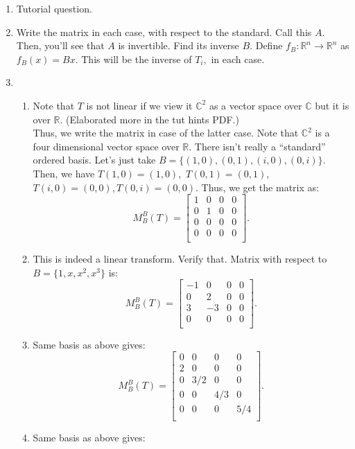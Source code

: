 \documentclass{article}
\begin{document}
\begin{enumerate}
	\item Tutorial question.
	\item Write the matrix in each case, with respect to the standard. Call this $A.$ Then, you'll see that $A$ is invertible. Find its inverse $B.$ Define $f_B:\mathbb{R}^n \to \mathbb{R}^n$ as $f_B(x) = Bx.$ This will be the inverse of $T_i,$ in each case.
	\item 
	\begin{enumerate}[label=(\roman*)] 
		\item Note that $T$ is not linear if we view it $\mathbb{C}^2$ as a vector space over $\mathbb{C}$ but it is over $\mathbb{R}.$ (Elaborated more in the tut hints PDF.)\\
		Thus, we write the matrix in case of the latter case. Note that $\mathbb{C}^2$ is a four dimensional vector space over $\mathbb{R}.$ There isn't really a ``standard'' ordered basis. Let's just take $B = \{(1, 0), (0, 1), (i, 0), (0, i)\}.$\\
		Then, we have $T(1, 0) = (1, 0),$ $T(0, 1) = (0, 1),$ $T(i, 0) = (0, 0), T(0, i) = (0, 0).$ Thus, we get the matrix as:
		\[M_B^B(T) = \begin{bmatrix}
			1 & 0 & 0 & 0\\
			0 & 1 & 0 & 0\\
			0 & 0 & 0 & 0\\
			0 & 0 & 0 & 0\\
		\end{bmatrix}.\]
		\item This is indeed a linear transform. Verify that. Matrix with respect to $B = \{1, x, x^2, x^3\}$ is:
		\[M_B^B(T) = \begin{bmatrix}
			-1 & 0 & 0 & 0\\
			0 & 2 & 0 & 0\\
			3 & -3 & 0 & 0\\
			0 & 0 & 0 & 0\\
		\end{bmatrix}.\]
		\item Same basis as above gives:
		\[M_B^B(T) = \begin{bmatrix}
			0 & 0 & 0 & 0\\
			2 & 0 & 0 & 0\\
			0 & 3/2 & 0 & 0\\
			0 & 0 & 4/3 & 0\\
			0 & 0 & 0 & 5/4\\
		\end{bmatrix}.\]
		\item Same basis as above gives:

\end{enumerate}
\end{enumerate}
\end{document}
